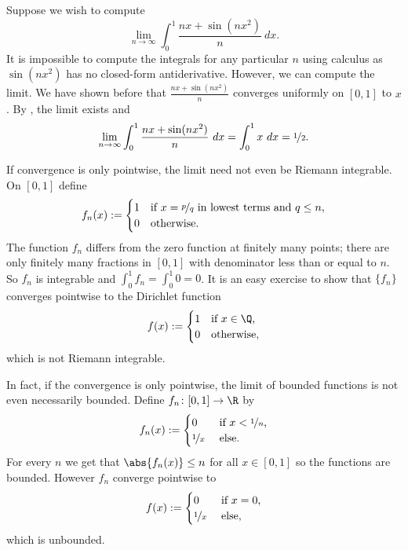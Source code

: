 \documentclass[12pt]{book}
\begin{document}
\begin{example}
Suppose we wish to compute
\begin{equation*}
\lim_{n\to\infty} \int_0^1 \frac{nx+ \sin(nx^2)}{n} ~dx .
\end{equation*}
It is impossible to compute the integrals for any particular $n$ using 
calculus as $\sin(nx^2)$ has no closed-form antiderivative.
However,
we can compute the limit.
We have shown before that $\frac{nx+ \sin(nx^2)}{n}$ converges uniformly
on $[0,1]$ to $x$.
By , the limit exists and
\begin{equation*}
\lim_{n\to\infty} \int_0^1 \frac{nx+ \sin(nx^2)}{n} ~dx
=
\int_0^1
x ~dx = \nicefrac{1}{2} .
\end{equation*}
\end{example}

\begin{example}
If convergence is only pointwise, the limit need not even be Riemann
integrable.
On $[0,1]$ define
\begin{equation*}
f_n(x) :=
\begin{cases}
1 & \text{if $x = \nicefrac{p}{q}$ in lowest terms and $q \leq n$,} \\
0 & \text{otherwise.}
\end{cases}
\end{equation*}
The function $f_n$ differs from the zero function at finitely many points;
there are only finitely many fractions in $[0,1]$ with denominator less than
or equal to $n$.
 So $f_n$ is integrable and $\int_0^1 f_n = \int_0^1 0 =
0$.
It is an easy exercise to show that $\{ f_n \}$ converges pointwise to the
Dirichlet function
\begin{equation*}
f(x) :=
\begin{cases}
1 & \text{if $x \in \Q$,} \\
0 & \text{otherwise,}
\end{cases}
\end{equation*}
which is not Riemann integrable.
\end{example}

\begin{example}
In fact, if the convergence is only pointwise, the limit of bounded
functions is not even necessarily bounded.
Define $f_n \colon [0,1] \to \R$ by
\begin{equation*}
f_n(x) :=
\begin{cases}
0 & \text{ if $x < \nicefrac{1}{n}$,}\\
\nicefrac{1}{x} & \text{ else.}
\end{cases}
\end{equation*}
For every $n$ we get that $\abs{f_n(x)} \leq n$ for all $x \in [0,1]$ so the
functions are bounded.
However $f_n$ converge pointwise to
\begin{equation*}
f(x) :=
\begin{cases}
0 & \text{ if $x = 0$,}\\
\nicefrac{1}{x} & \text{ else,}
\end{cases}
\end{equation*}
which is unbounded.
\end{example}
\end{document}
